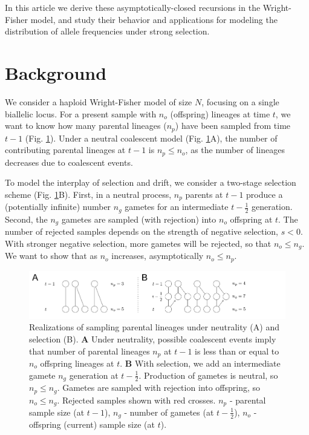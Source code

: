 \documentclass[review]{elsarticle}
\begin{document}
In this article we derive these asymptotically-closed recursions in the Wright-Fisher model, and
study their behavior and applications for modeling the distribution of allele frequencies under
strong selection.


\section{Background}
\label{sec:background}

We consider a haploid Wright-Fisher model of size $N$, focusing on a single biallelic locus. For a
present sample with $n_o$ (offspring) lineages at time $t$, we want to know how many parental
lineages ($n_p$) have been sampled from time $t-1$ (Fig. \ref{fig:schematic}). Under a neutral
coalescent model (Fig. \ref{fig:schematic}A), the number of contributing parental lineages at $t-1$
is $n_p \le n_o$, as the number of lineages decreases due to coalescent events.

To model the interplay of selection and drift, we consider a two-stage selection scheme (Fig.
\ref{fig:schematic}B). First, in a neutral process, $n_p$ parents at $t-1$ produce a (potentially
infinite) number $n_g$ gametes for an intermediate $t-\frac{1}{2}$ generation. Second, the $n_g$
gametes are sampled (with rejection) into $n_o$ offspring at $t$. The number of rejected samples
depends on the strength of negative selection, $s<0$. With stronger negative selection, more gametes
will be rejected, so that $n_o \le n_g$. We want to show that as $n_o$ increases, asymptotically
$n_o \le n_p$.

\begin{figure}[ht]
  \centering
  \includegraphics[width=1.0\textwidth]{fig/schematic.pdf}
  \caption{\label{fig:schematic} Realizations of sampling parental lineages under neutrality (A) and
    selection (B). \textbf{A} Under neutrality, possible coalescent events imply that number of
    parental lineages $n_p$ at $t-1$ is less than or equal to $n_o$ offspring lineages at $t$.
    \textbf{B} With selection, we add an intermediate gamete $n_g$ generation at $t-\frac{1}{2}$.
    Production of gametes is neutral, so $n_p\le n_g$. Gametes are sampled with rejection into
    offspring, so $n_o \le n_g$. Rejected samples shown with red crosses. $n_p$ - parental sample
    size (at $t-1$), $n_g$ - number of gametes (at $t-\frac{1}{2}$), $n_o$ - offspring (current)
    sample size (at $t$).}
\end{figure}
\end{document}
